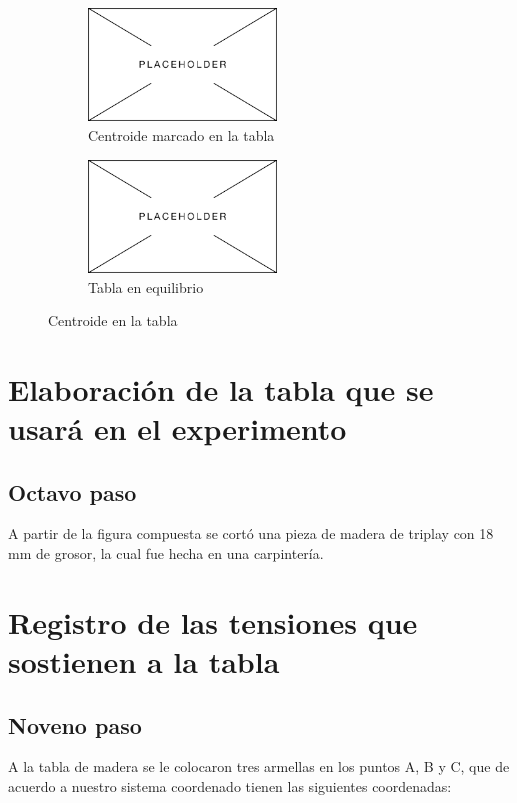\documentclass[12pt, titlepage]{report}
\begin{document}
    \begin{figure}[ht]
        \centering
        \begin{subfigure}[l]{0.4\textwidth}
            \centering
            \includegraphics[height=3cm]{Placeholder.png}
            \caption{Centroide marcado en la tabla}
        \end{subfigure}
        \begin{subfigure}[3]{0.4\textwidth}
            \centering
            \includegraphics[height=3cm]{Placeholder.png}
            \caption{Tabla en equilibrio}
        \end{subfigure}
        \caption{Centroide en la tabla}
    \end{figure}

    \hfill
    \section{Elaboración de la tabla que se usará en el experimento}
    \subsection*{Octavo paso}
    A partir de la figura compuesta se cortó una pieza de madera de triplay con 18 mm de grosor, la cual fue hecha en una carpintería.

    \hfill
    \section{Registro de las tensiones que sostienen a la tabla}
    \subsection*{Noveno paso}
    A la tabla de madera se le colocaron tres armellas en los puntos A, B y C, que de acuerdo a nuestro sistema coordenado tienen las siguientes coordenadas:
\end{document}
